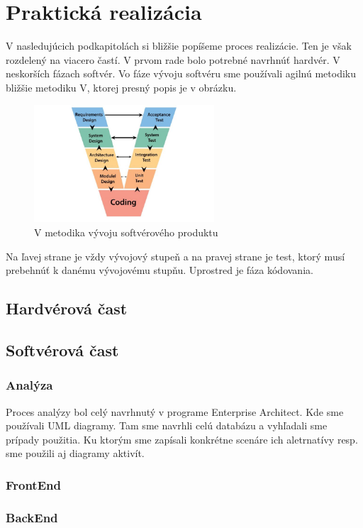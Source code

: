 \chapter{Praktická realizácia}
V nasledujúcich podkapitolách si bližšie popíšeme proces realizácie. Ten je však rozdelený na viacero častí. V prvom rade bolo potrebné navrhnúť hardvér. V neskorších fázach softvér. Vo fáze vývoju softvéru sme používali agilnú metodiku bližšie metodiku V, ktorej presný popis je v obrázku.

\begin{figure}[h!]
    \centering
    \includegraphics[width=0.6\textwidth]{obrazky/V_model.jpg}
    \caption{V metodika vývoju softvérového produktu}
\end{figure}
Na ľavej strane je vždy vývojový stupeň a na pravej strane je test, ktorý musí prebehnúť k danému vývojovému stupňu. Uprostred je fáza kódovania. 
\section{Hardvérová čast}
\section{Softvérová čast}
\subsection{Analýza}
Proces analýzy bol celý navrhnutý v programe Enterprise Architect. Kde sme používali \acs{UML} diagramy. Tam sme navrhli celú databázu a vyhľadali sme prípady použitia. Ku ktorým sme zapísali konkrétne scenáre ich aletrnatívy resp. sme použili aj diagramy aktivít. 
\subsection{FrontEnd}

\subsection{BackEnd}

